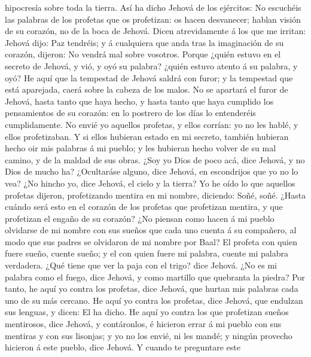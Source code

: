 hipocresía sobre toda la tierra.  Así ha dicho Jehová de
los ejércitos: No escuchéis las palabras de los profetas que os
profetizan: os hacen desvanecer; hablan visión de su corazón, no de la
boca de Jehová.  Dicen atrevidamente á los que me
irritan: Jehová dijo: Paz tendréis; y á cualquiera que anda tras la
imaginación de su corazón, dijeron: No vendrá mal sobre vosotros.
 Porque ¿quién estuvo en el secreto de Jehová, y vió, y
oyó su palabra? ¿quién estuvo atento á su palabra, y oyó?
 He aquí que la tempestad de Jehová saldrá con furor; y
la tempestad que está aparejada, caerá sobre la cabeza de los malos.
 No se apartará el furor de Jehová, hasta tanto que haya
hecho, y hasta tanto que haya cumplido los pensamientos de su corazón:
en lo postrero de los días lo entenderéis cumplidamente. 
No envié yo aquellos profetas, y ellos corrían: yo no les hablé, y ellos
profetizaban.  Y si ellos hubieran estado en mi secreto,
también hubieran hecho oir mis palabras á mi pueblo; y les hubieran
hecho volver de su mal camino, y de la maldad de sus obras.
 ¿Soy yo Dios de poco acá, dice Jehová, y no Dios de
mucho ha?  ¿Ocultaráse alguno, dice Jehová, en
escondrijos que yo no lo vea? ¿No hincho yo, dice Jehová, el cielo y la
tierra?  Yo he oído lo que aquellos profetas dijeron,
profetizando mentira en mi nombre, diciendo: Soñé, soñé. 
¿Hasta cuándo será esto en el corazón de los profetas que profetizan
mentira, y que profetizan el engaño de su corazón?  ¿No
piensan como hacen á mi pueblo olvidarse de mi nombre con sus sueños que
cada uno cuenta á su compañero, al modo que sus padres se olvidaron de
mi nombre por Baal?  El profeta con quien fuere sueño,
cuente sueño; y el con quien fuere mi palabra, cuente mi palabra
verdadera. ¿Qué tiene que ver la paja con el trigo? dice Jehová.
 ¿No es mi palabra como el fuego, dice Jehová, y como
martillo que quebranta la piedra?  Por tanto, he aquí yo
contra los profetas, dice Jehová, que hurtan mis palabras cada uno de su
más cercano.  He aquí yo contra los profetas, dice
Jehová, que endulzan sus lenguas, y dicen: El ha dicho. 
He aquí yo contra los que profetizan sueños mentirosos, dice Jehová, y
contáronlos, é hicieron errar á mi pueblo con sus mentiras y con sus
lisonjas; y yo no los envié, ni les mandé; y ningún provecho hicieron á
este pueblo, dice Jehová.  Y cuando te preguntare este
